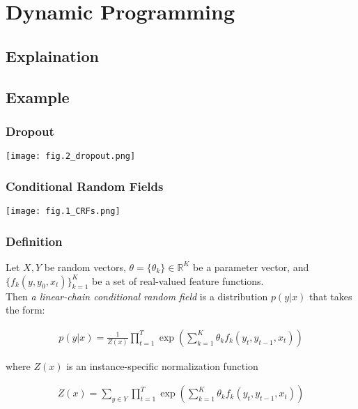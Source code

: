 \documentclass{beamer}
\begin{document}
\section{Dynamic Programming}
\subsection{Explaination}
\subsection{Example}


\begin{frame}[fragile] %
\frametitle{Dropout}

\centerline{\texttt{[image: fig.2\_dropout.png]}}

\end{frame}

\begin{frame}
\frametitle{Conditional Random Fields}
\centerline{\texttt{[image: fig.1\_CRFs.png]}}

\end{frame}

\begin{frame}
\frametitle{Definition}
\begin{Definition}

Let $X, Y$ be random vectors, $\theta = \{\theta_k\} \in \mathbb{R}^K$ be a parameter vector, and $\{f_k(y, y_0, x_t)\}_{k=1}^{K} $ be a set of real-valued feature functions.\\
Then \textit{a linear-chain conditional random field} is a distribution $p(y|x)$ that takes the form:

\begin{align*}
    p(y \vert x) = \frac{1}{Z(x)} \prod_{t=1}^{T} \exp\left(\sum_{k=1}^{K} \theta_k f_k(y_t, y_{t-1}, x_t)\right)    
\end{align*}
   

where $Z(x)$ is an instance-specific normalization function

\begin{align*}
    Z(x) = \sum_{y \in Y} \prod_{t=1}^{T} \exp \left( \sum_{k=1}^{K} \theta_k f_k(y_t, y_{t-1}, x_t) \right)    
\end{align*}


\end{Definition}


\end{frame}
\end{document}
